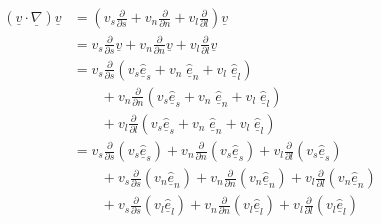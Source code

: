 \begin{equation*}
  \begin{split}
    (\underline{v}\cdot\underline{\nabla})\underline{v}&=
    \left(v_{s}\frac{\partial}{\partial{}s}+
    v_{n}\frac{\partial}{\partial{}n}+
    v_{l}\frac{\partial}{\partial{}l}\right)\underline{v} \\
    &=v_{s}\frac{\partial}{\partial{}s}\underline{v}+
    v_{n}\frac{\partial}{\partial{}n}\underline{v}+
    v_{l}\frac{\partial}{\partial{}l}\underline{v} \\
    &=v_{s}\frac{\partial}{\partial{}s}(v_{s}\hat{\underline{e}}_{s}+v_{n}\;\hat{\underline{e}}_{n}+v_{l}\;\hat{\underline{e}}_{l}) \\
    &\qquad+v_{n}\frac{\partial}{\partial{}n}(v_{s}\hat{\underline{e}}_{s}+v_{n}\;\hat{\underline{e}}_{n}+v_{l}\;\hat{\underline{e}}_{l}) \\
    &\qquad+v_{l}\frac{\partial}{\partial{}l}(v_{s}\hat{\underline{e}}_{s}+v_{n}\;\hat{\underline{e}}_{n}+v_{l}\;\hat{\underline{e}}_{l}) \\
    &=v_{s}\frac{\partial}{\partial{}s}(v_{s}\hat{\underline{e}}_{s})+v_{n}\frac{\partial}{\partial{}n}(v_{s}\hat{\underline{e}}_{s})+
    v_{l}\frac{\partial}{\partial{}l}(v_{s}\hat{\underline{e}}_{s}) \\
    &\qquad+v_{s}\frac{\partial}{\partial{}s}(v_{n}\hat{\underline{e}}_{n})+v_{n}\frac{\partial}{\partial{}n}(v_{n}\hat{\underline{e}}_{n})+
    v_{l}\frac{\partial}{\partial{}l}(v_{n}\hat{\underline{e}}_{n}) \\
    &\qquad+v_{s}\frac{\partial}{\partial{}s}(v_{l}\hat{\underline{e}}_{l})+v_{n}\frac{\partial}{\partial{}n}(v_{l}\hat{\underline{e}}_{l})+
    v_{l}\frac{\partial}{\partial{}l}(v_{l}\hat{\underline{e}}_{l}) \\
  \end{split}
\end{equation*}

